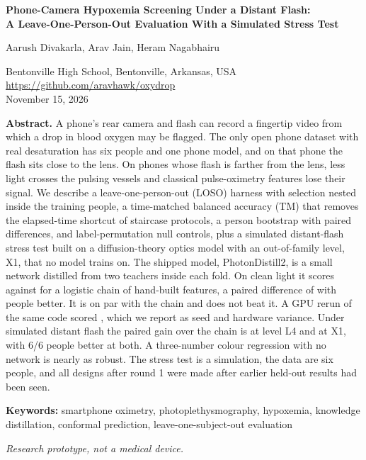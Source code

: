 \documentclass[11pt,letterpaper]{article}
\begin{document}
\raggedright
\setlength{\parindent}{0pt}
\setlength{\parskip}{0.6em plus 0.2em minus 0.1em}

\begin{center}
{\Large\bfseries Phone-Camera Hypoxemia Screening Under a Distant Flash:\\[0.25em]
A Leave-One-Person-Out Evaluation With a Simulated Stress Test\par}
\vspace{1.2em}
{\large Aarush Divakarla, Arav Jain, Heram Nagabhairu\par}
\vspace{0.4em}
Bentonville High School, Bentonville, Arkansas, USA\\
\url{https://github.com/aravhawk/oxydrop}\\[0.4em]
November 15, 2026
\end{center}
\vspace{1.0em}

\begin{list}{}{\setlength{\leftmargin}{0.5in}\setlength{\rightmargin}{0.5in}\setlength{\topsep}{0pt}\setlength{\parsep}{0.6em}}
\item[]\textbf{Abstract.} A phone's rear camera and flash can record a fingertip video from which a drop in blood oxygen may be flagged. The only open phone dataset with real desaturation has six people and one phone model, and on that phone the flash sits close to the lens. On phones whose flash is farther from the lens, less light crosses the pulsing vessels and classical pulse-oximetry features lose their signal. We describe a leave-one-person-out (LOSO) harness with selection nested inside the training people, a time-matched balanced accuracy (TM) that removes the elapsed-time shortcut of staircase protocols, a person bootstrap with paired differences, and label-permutation null controls, plus a simulated distant-flash stress test built on a diffusion-theory optics model with an out-of-family level, X1, that no model trains on. The shipped model, PhotonDistill2, is a small network distilled from two teachers inside each fold. On clean light it scores \WinLzero{} \WinLzeroCI{} against \ChainLzero{} \ChainLzeroCI{} for a logistic chain of hand-built features, a paired difference of \WinLzeroDiff{} \WinLzeroDiffCI{} with \WinLzeroBetter{} people better. It is on par with the chain and does not beat it. A GPU rerun of the same code scored \DistillTwoGpuLzero{} \DistillTwoGpuLzeroCI{}, which we report as seed and hardware variance. Under simulated distant flash the paired gain over the chain is \WinLfourDiff{} \WinLfourDiffCI{} at level L4 and \WinXoneDiff{} \WinXoneDiffCI{} at X1, with 6/6 people better at both. A three-number colour regression with no network is nearly as robust. The stress test is a simulation, the data are six people, and all designs after round 1 were made after earlier held-out results had been seen.

\textbf{Keywords:} smartphone oximetry, photoplethysmography, hypoxemia, knowledge distillation, conformal prediction, leave-one-subject-out evaluation

\textit{Research prototype, not a medical device.}
\end{list}
\vspace{0.6em}
\end{document}
